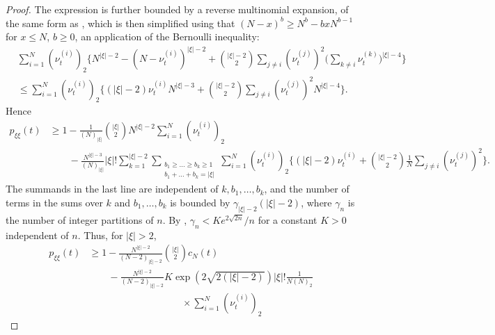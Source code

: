\begin{proof}
The expression is further bounded by a reverse multinomial expansion, of the same form as \textcite[Equation (8)]{koskela2018}, which is then simplified using that $(N - x)^b \geq N^b - b x N^{ b - 1 }$ 
for $x \leq N$, $b \geq 0$, an application of the Bernoulli inequality:
\begin{align*}
& \sum_{ i = 1 }^N ( \nu_t^{ ( i ) } )_2 
        \Bigg\{ N^{ | \xi | - 2 } - ( N - \nu_t^{ ( i ) } )^{ | \xi | - 2 } 
        + \binom{ | \xi | - 2 }{ 2 } \sum_{ j \neq i } ( \nu_t^{ ( j ) } )^2 
        \Bigg( \sum_{ k \neq i } \nu_t^{ ( k ) } \Bigg)^{ | \xi | - 4 } \Bigg\} \\
&\leq \sum_{ i = 1 }^N ( \nu_t^{ ( i ) } )_2 
        \Bigg\{ ( | \xi | - 2 ) \nu_t^{ ( i ) } N^{ | \xi | - 3 } 
        + \binom{ | \xi | - 2 }{ 2 } \sum_{ j \neq i } ( \nu_t^{ ( j ) } )^2 N^{ | \xi | - 4 } 
        \Bigg\} .
\end{align*}
Hence
\begin{align*}
p_{ \xi \xi }( t ) 
&\geq 1 - \frac{ 1 }{ ( N )_{ | \xi | } } \binom{|\xi|}{2}
        N^{ | \xi | - 2 } \sum_{ i = 1 }^N ( \nu_t^{ ( i ) } )_2 \\
    &\qquad- \frac{ N^{|\xi|-3} }{ ( N )_{ | \xi | } } |\xi|!
        \sum_{ k = 1 }^{ | \xi | - 2 } 
        \sum_{ \substack{ b_1 \geq \ldots \geq b_k \geq 1 
        \\ b_1 + \ldots + b_k = | \xi | } } 
        \sum_{ i = 1 }^N ( \nu_t^{ ( i ) } )_2 
        \Bigg\{ ( | \xi | - 2 ) \nu_t^{ ( i ) } + \binom{ | \xi | - 2 }{ 2 } \frac{1}{N} 
        \sum_{ j \neq i } ( \nu_t^{ ( j ) } )^2 \Bigg\} .
\end{align*}
The summands in the last line are independent of $k, b_1, \dots, b_k$, and the number of terms in the sums over $k$ and $b_1, \dots, b_k$ is bounded by $\gamma_{|\xi|-2} (|\xi|-2)$, where $\gamma_n$ is the number of integer partitions of $n$.
By \textcite[Section 2]{hardy1918}, $\gamma_n < K e^{ 2 \sqrt{ 2 n } } / n$ for a constant $K > 0$ independent of $n$.
Thus, for $|\xi| > 2$,
\begin{align*}
p_{ \xi \xi }( t ) 
&\geq 1 - \frac{ N^{ | \xi | - 2 } }{ ( N-2 )_{ | \xi | -2} } \binom{|\xi|}{2}
        c_N(t) \\
    &\qquad- \frac{ N^{|\xi|-2} }{ ( N-2 )_{ | \xi | -2} }
        K \exp( 2 \sqrt{2(|\xi|-2)} ) |\xi|!
        \frac{1}{N(N)_2} \\
    &\hspace{4cm}\times \sum_{ i = 1 }^N ( \nu_t^{ ( i ) } )_2

\end{align*}
\end{proof}
